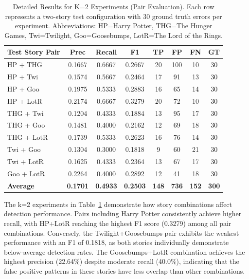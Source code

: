 \begin{table}[htbp]
\centering
\caption{Detailed Results for K=2 Experiments (Pair Evaluation). Each row represents a two-story test configuration with 30 ground truth errors per experiment. Abbreviations: HP=Harry Potter, THG=The Hunger Games, Twi=Twilight, Goo=Goosebumps, LotR=The Lord of the Rings.}
\label{tab:k2_detailed}
\begin{tabular}{lccccccc}
\toprule
\textbf{Test Story Pair} & \textbf{Prec} & \textbf{Recall} & \textbf{F1} & \textbf{TP} & \textbf{FP} & \textbf{FN} & \textbf{GT} \\
\midrule
HP + THG & 0.1667 & 0.6667 & 0.2667 & 20 & 100 & 10 & 30 \\
HP + Twi & 0.1574 & 0.5667 & 0.2464 & 17 & 91 & 13 & 30 \\
HP + Goo & 0.1975 & 0.5333 & 0.2883 & 16 & 65 & 14 & 30 \\
HP + LotR & 0.2174 & 0.6667 & 0.3279 & 20 & 72 & 10 & 30 \\
THG + Twi & 0.1204 & 0.4333 & 0.1884 & 13 & 95 & 17 & 30 \\
THG + Goo & 0.1481 & 0.4000 & 0.2162 & 12 & 69 & 18 & 30 \\
THG + LotR & 0.1739 & 0.5333 & 0.2623 & 16 & 76 & 14 & 30 \\
Twi + Goo & 0.1304 & 0.3000 & 0.1818 & 9 & 60 & 21 & 30 \\
Twi + LotR & 0.1625 & 0.4333 & 0.2364 & 13 & 67 & 17 & 30 \\
Goo + LotR & 0.2264 & 0.4000 & 0.2892 & 12 & 41 & 18 & 30 \\
\midrule
\textbf{Average} & \textbf{0.1701} & \textbf{0.4933} & \textbf{0.2503} & \textbf{148} & \textbf{736} & \textbf{152} & \textbf{300} \\
\bottomrule
\end{tabular}
\end{table}

The k=2 experiments in Table~\ref{tab:k2_detailed} demonstrate how story combinations affect detection performance. Pairs including Harry Potter consistently achieve higher recall, with HP+LotR reaching the highest F1 score (0.3279) among all pair combinations. Conversely, the Twilight+Goosebumps pair exhibits the weakest performance with an F1 of 0.1818, as both stories individually demonstrate below-average detection rates. The Goosebumps+LotR combination achieves the highest precision (22.64\%) despite moderate recall (40.0\%), indicating that the false positive patterns in these stories have less overlap than other combinations.

